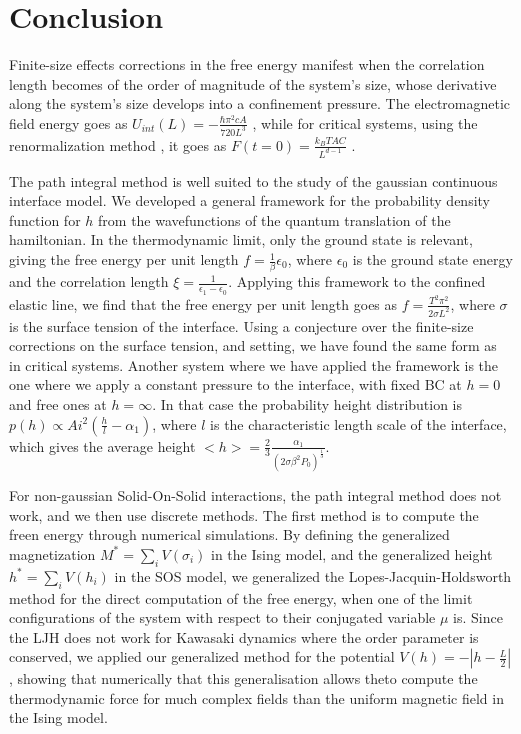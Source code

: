 \section{Conclusion}

Finite-size effects corrections in the free energy manifest when the correlation length becomes of the order of magnitude of the system's size, whose derivative along the system's size develops into a confinement pressure. The electromagnetic field energy goes as $U_{int}(L) = -\frac{\hbar \pi^2 c A}{720 L^3}$ \cite{h_b_g_casimir_attraction_1948,sm_rytov_principles_1989,lifshits_theory_1955}, while for critical systems, using the renormalization method \cite{amit_field_2005}, it goes as $F(t=0) = \frac{k_B T A C}{L^{d-1}}$ \cite{gambassi_casimir_2009}.

The path integral method \cite{matsubara_new_1955} is well suited to the study of the gaussian continuous interface model. We developed a general framework for the probability density function for $h$ from the wavefunctions of the quantum translation of the hamiltonian. In the thermodynamic limit, only the ground state  is relevant, giving the free energy per unit length $f= \frac{1}{\beta}\epsilon_0$, where $\epsilon_0$ is the ground state energy and the correlation length $\xi = \frac{1}{\epsilon_1-\epsilon_0}$. 
Applying this framework to the confined elastic line, we find that the free energy per unit length goes as $f = \frac{T^2 \pi^2}{2 \sigma L^2}$, where $\sigma$ is the surface tension of the interface. Using a conjecture \cite{privman_finite-size_1988-1} over the finite-size corrections on the surface tension, and setting, we have found the same form as in critical systems. 
Another system where we have applied the framework is the one where we apply a constant pressure to the interface, with fixed BC at $h=0$ and free ones at $h=\infty$. In that case the probability height distribution is $p(h) \propto Ai^2(\frac{h}{l}-\alpha_1)$, where $l$ is the characteristic length scale of the interface, which gives the average height $<h> = \frac{2}{3}\frac{\alpha_1}{\left(2\sigma \beta^2 P_0 \right)^\frac{1}{3}}$.

For non-gaussian Solid-On-Solid interactions, the path integral method does not work, and we then use discrete methods. The first method is to compute the freen energy through numerical simulations. By defining the generalized magnetization $M^\ast = \sum_i V(\sigma_i)$ in the Ising model, and the generalized height $h^\ast = \sum_i V(h_i)$ in the SOS model, we generalized the Lopes-Jacquin-Holdsworth method \cite{lopes_cardozo_critical_2014} for the direct computation of the free energy, when one of the limit configurations of the system with respect to their conjugated variable $\mu$ is. Since the LJH does not work for Kawasaki dynamics where the order parameter is conserved, we applied our generalized method for the potential $V(h) = - | h - \frac{L}{2}|$, showing that numerically that this generalisation allows theto compute the thermodynamic force for much complex fields than the uniform magnetic field in the Ising model.

